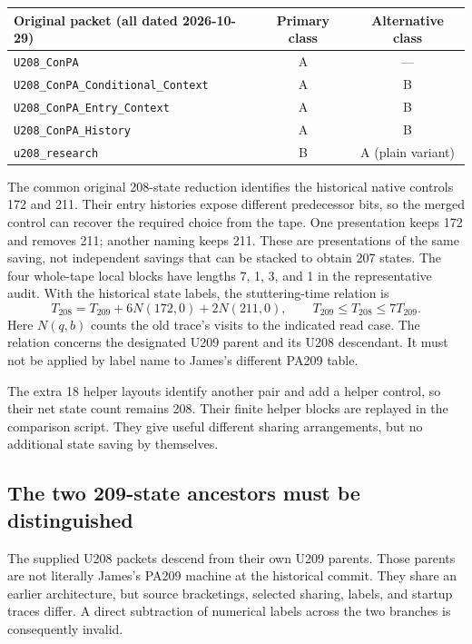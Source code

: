 \documentclass[11pt,a4paper]{article}
\begin{document}
\begin{center}\small
\begin{tabular}{@{}lcc@{}}
\toprule
Original packet (all dated 2026-10-29)&Primary class&Alternative class\\
\midrule
\texttt{U208\_ConPA}&A&---\\
\texttt{U208\_ConPA\_Conditional\_Context}&A&B\\
\texttt{U208\_ConPA\_Entry\_Context}&A&B\\
\texttt{U208\_ConPA\_History}&A&B\\
\texttt{u208\_research}&B&A (plain variant)\\
\bottomrule
\end{tabular}
\end{center}

The common original 208-state reduction identifies the historical native
controls 172 and 211. Their entry histories expose different predecessor
bits, so the merged control can recover the required choice from the tape.
One presentation keeps 172 and removes 211; another naming keeps 211.
These are presentations of the same saving, not independent savings that
can be stacked to obtain 207 states. The four whole-tape local blocks have
lengths 7, 1, 3, and 1 in the representative audit. With the historical
state labels, the stuttering-time relation is
\[
 T_{208}=T_{209}+6N(172,0)+2N(211,0),\qquad
 T_{209}\le T_{208}\le7T_{209}.
\]
Here $N(q,b)$ counts the old trace's visits to the indicated read case.
The relation concerns the designated U209 parent and its U208 descendant.
It must not be applied by label name to James's different PA209 table.

The extra 18 helper layouts identify another pair and add a helper control,
so their net state count remains 208. Their finite helper blocks are replayed
in the comparison script. They give useful different sharing arrangements,
but no additional state saving by themselves.


\subsection{The two 209-state ancestors must be distinguished}
The supplied U208 packets descend from their own U209 parents. Those parents
are not literally James's PA209 machine at the historical commit. They share
an earlier architecture, but source bracketings, selected sharing, labels,
and startup traces differ. A direct subtraction of numerical labels across
the two branches is consequently invalid.
\end{document}
